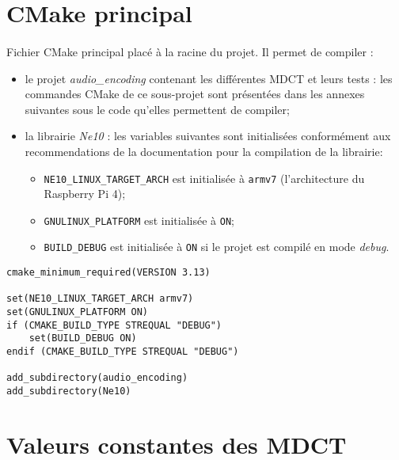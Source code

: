 \documentclass{article}
\begin{document}
\section{CMake principal}\label{app:cmake_super}
\paragraph{}
Fichier CMake principal placé à la racine du projet. Il permet de compiler :
\begin{itemize}
    \item le projet \emph{audio\_encoding} contenant les différentes MDCT et leurs tests : les commandes CMake de ce sous-projet sont présentées dans les annexes suivantes sous le code qu'elles permettent de compiler;
    \item la librairie \emph{Ne10} : les variables suivantes sont initialisées conformément aux recommendations de la documentation pour la compilation de la librairie:
    \begin{itemize}
        \item \texttt{NE10\_LINUX\_TARGET\_ARCH} est initialisée à \texttt{armv7} (l'architecture du Raspberry Pi 4);
        \item \texttt{GNULINUX\_PLATFORM} est initialisée à \texttt{ON};
        \item \texttt{BUILD\_DEBUG} est initialisée à \texttt{ON} si le projet est compilé en mode \emph{debug}.
    \end{itemize}
\end{itemize}
\lstset{language=make}
\begin{lstlisting}
cmake_minimum_required(VERSION 3.13)

set(NE10_LINUX_TARGET_ARCH armv7)
set(GNULINUX_PLATFORM ON)
if (CMAKE_BUILD_TYPE STREQUAL "DEBUG")
    set(BUILD_DEBUG ON)
endif (CMAKE_BUILD_TYPE STREQUAL "DEBUG")

add_subdirectory(audio_encoding)
add_subdirectory(Ne10)
\end{lstlisting}


\newpage
\section{Valeurs constantes des MDCT}\label{app:mdct_const}
\end{document}
